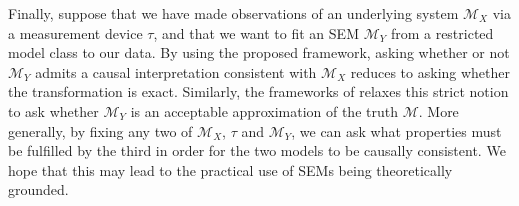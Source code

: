 Finally, suppose that we have made observations of an underlying system $\mathcal{M}_X$ via a measurement device $\tau$, and that we want to fit an SEM $\mathcal{M}_Y$ from a restricted model class to our data.
By using the proposed framework, asking whether or not $\mathcal{M}_Y$ admits a causal interpretation consistent with $\mathcal{M}_X$ reduces to asking whether the transformation is exact.
Similarly, the frameworks of \cite{sanders2} relaxes this strict notion to ask whether $\mathcal{M}_Y$ is an acceptable approximation of the truth $\mathcal{M}$.
More generally, by fixing any two of $\mathcal{M}_X$, $\tau$ and $\mathcal{M}_Y$, we can ask what properties must be fulfilled by the third in order for the two models to be causally consistent.
We hope that this may lead to the practical use of SEMs being theoretically grounded.








































